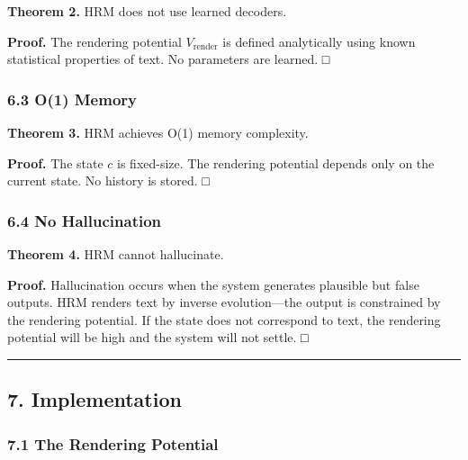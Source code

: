 \documentclass[
  11pt,
  a4paper,
]{article}
\begin{document}
\textbf{Theorem 2.} HRM does not use learned decoders.

\textbf{Proof.} The rendering potential \(V_{\text{render}}\) is defined
analytically using known statistical properties of text. No parameters
are learned. □

\subsubsection{6.3 O(1) Memory}\label{o1-memory}

\textbf{Theorem 3.} HRM achieves O(1) memory complexity.

\textbf{Proof.} The state \(c\) is fixed-size. The rendering potential
depends only on the current state. No history is stored. □

\subsubsection{6.4 No Hallucination}\label{no-hallucination}

\textbf{Theorem 4.} HRM cannot hallucinate.

\textbf{Proof.} Hallucination occurs when the system generates plausible
but false outputs. HRM renders text by inverse evolution---the output is
constrained by the rendering potential. If the state does not correspond
to text, the rendering potential will be high and the system will not
settle. □

\begin{center}\rule{0.5\linewidth}{0.5pt}\end{center}

\subsection{7. Implementation}\label{implementation}

\subsubsection{7.1 The Rendering
Potential}\label{the-rendering-potential-2}
\end{document}
